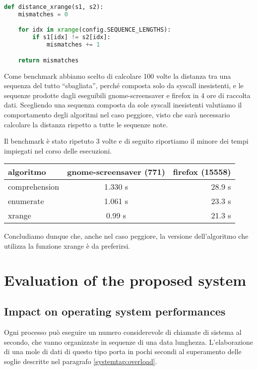 \documentclass[11pt]{article}
\begin{document}
\begin{lstlisting}[language=Python]
def distance_xrange(s1, s2):
    mismatches = 0

    for idx in xrange(config.SEQUENCE_LENGTHS):
        if s1[idx] != s2[idx]:
            mismatches += 1

    return mismatches
\end{lstlisting}

Come benchmark abbiamo scelto di calcolare 100 volte la distanza tra una
sequenza del tutto ``sbagliata'', perché composta solo da syscall inesistenti,
e le sequenze prodotte dagli eseguibili gnome-screensaver e firefox in 4 ore di
raccolta dati. Scegliendo una sequenza composta da sole syscall inesistenti
valutiamo il comportamento degli algoritmi nel caso peggiore, visto che sarà
necessario calcolare la distanza rispetto a tutte le sequenze note.

Il benchmark è stato ripetuto 3 volte e di seguito riportiamo il minore dei
tempi impiegati nel corso delle esecuzioni.

\begin{tabular}{l | c  r}
algoritmo       & gnome-screensaver (771)  & firefox (15558) \\
\hline
comprehension   & 1.330 s                  & 28.9 s          \\
enumerate       & 1.061 s                  & 23.3 s          \\
xrange          & 0.99 s                   & 21.3 s          \\
\end{tabular}

Concludiamo dunque che, anche nel caso peggiore, la versione dell'algoritmo che
utilizza la funzione xrange è da preferirsi.


\section{Evaluation of the proposed system}

\subsection{Impact on operating system performances}
Ogni processo può eseguire un numero considerevole di chiamate di sistema al
secondo, che vanno organizzate in sequenze di una data lunghezza.
L'elaborazione di una mole di dati di questo tipo porta in pochi secondi al
superamento delle soglie descritte nel paragrafo \ref{systemtap:overload}. 
\end{document}
